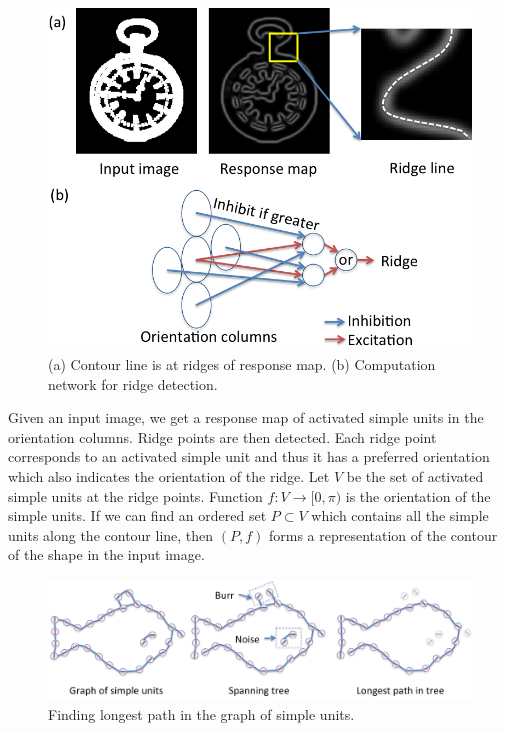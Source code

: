 \documentclass[10pt,letterpaper]{article}
\begin{document}
\begin{figure}[ht]
\begin{center}
\includegraphics[width=0.95\linewidth]{images/fig4.png}
\end{center}
\caption{(a) Contour line is at ridges of response map.
(b) Computation network for ridge detection.} 
\label{fig:4}
\end{figure}

Given an input image, we get a response map of activated simple units in the orientation columns.
Ridge points are then detected. Each ridge point corresponds to an activated simple unit
and thus it has a preferred orientation which also indicates the orientation of the ridge.
Let $V$ be the set of activated simple units at the ridge points.
Function $f:V\rightarrow[0,\pi)$ is the orientation of the simple units.
If we can find an ordered set $P\subset V$ which contains all the simple units along the contour line,
then $(P,f)$ forms a representation of the contour of the shape in the input image.

\begin{figure}[ht]
\begin{center}
\includegraphics[width=0.99\linewidth]{images/fig5.png}
\end{center}
\caption{Finding longest path in the graph of simple units.} 
\label{fig:5}
\end{figure}
\end{document}

